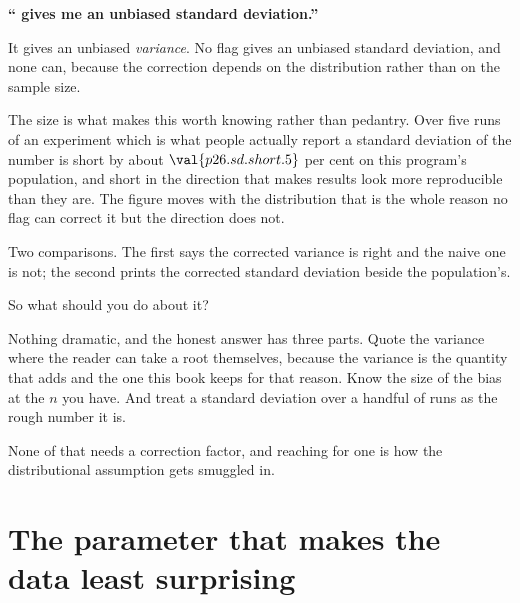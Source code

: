 \begin{fr}
\begin{trapbox}
\textbf{\enquote{ gives me an unbiased standard deviation.}}

It gives an unbiased \emph{variance}. No  flag gives an unbiased
standard deviation, and none can, because the correction depends on the
distribution rather than on the sample size.

The size is what makes this worth knowing rather than pedantry. Over five
runs of an experiment \dash{} which is what people actually report a standard
deviation of \dash{} the number is short by about
$\val{p26.sd.short.5}$ per cent on this program's population, and short in
the direction that makes results look more reproducible than they are. The
figure moves with the distribution \dash{} that is the whole reason no flag
can correct it \dash{} but the direction does not.
\end{trapbox}
\end{fr}

\begin{fr}

Two comparisons. The first says the corrected variance is right and the naive
one is not; the second prints the corrected standard deviation beside the
population's.
\end{fr}

\begin{fr}
So what should you do about it?

Nothing dramatic, and the honest answer has three parts. Quote the variance
where the reader can take a root themselves, because the variance is the
quantity that adds and the one this book keeps for that reason. Know the
size of the bias at the $n$ you have. And treat a standard deviation over a
handful of runs as the rough number it is.

None of that needs a correction factor, and reaching for one is how the
distributional assumption gets smuggled in.
\end{fr}

\section{The parameter that makes the data least surprising}
\label{sec:P26-mle}

